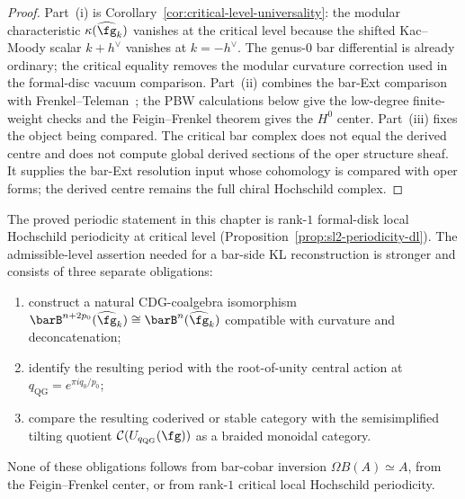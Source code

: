 \begin{proof}
Part~(i) is Corollary~\ref{cor:critical-level-universality}: the
modular characteristic $\kappa(\widehat{\fg}_k)$ vanishes at the critical level
because the shifted Kac--Moody scalar $k+h^\vee$ vanishes at
$k = -h^\vee$. The genus-$0$ bar differential is already ordinary;
the critical equality removes the modular curvature correction used in
the formal-disc vacuum comparison. Part~(ii) combines the bar-Ext comparison with
Frenkel--Teleman~\cite{FT06}; the PBW calculations below give the
low-degree finite-weight checks and the Feigin--Frenkel theorem gives
the $H^0$ center. Part~(iii) fixes the object being compared. The
critical bar complex does not equal the derived centre and does not
compute global derived sections of the oper structure sheaf. It
supplies the bar-Ext resolution input whose cohomology is compared
with oper forms; the derived centre remains the full chiral
Hochschild complex.
\end{proof}

\begin{remark}
The proved periodic statement in this chapter is rank-$1$ formal-disk
local Hochschild periodicity at critical level
\textup{(}Proposition~\ref{prop:sl2-periodicity-dl}\textup{)}. The
admissible-level assertion needed for a bar-side KL reconstruction is
stronger and consists of three separate obligations:
\begin{enumerate}[label=\textup{(\arabic*)}]
\item construct a natural CDG-coalgebra isomorphism
 $\barB^{n+2p_0}(\widehat{\fg}_k)\cong \barB^n(\widehat{\fg}_k)$
 compatible with curvature and deconcatenation;
\item identify the resulting period with the root-of-unity central
 action at $q_{\mathrm{QG}}=e^{\pi i q_0/p_0}$;
\item compare the resulting coderived or stable category with the
 semisimplified tilting quotient
 $\mathcal C(U_{q_{\mathrm{QG}}}(\fg))$ as a braided monoidal category.
\end{enumerate}
None of these obligations follows from bar-cobar inversion
$\Omega B(A)\simeq A$, from the Feigin--Frenkel center, or from
rank-$1$ critical local Hochschild periodicity.
\end{remark}

